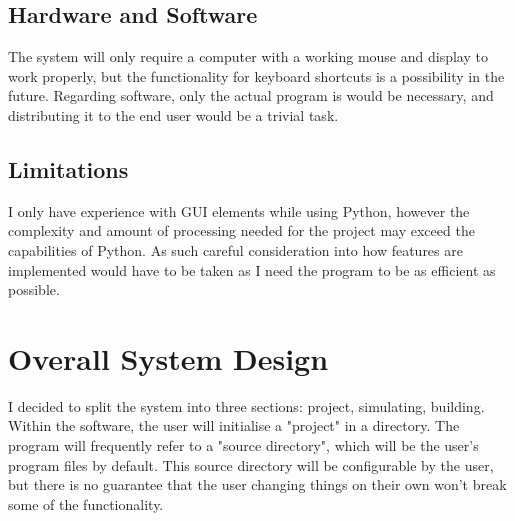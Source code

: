 \documentclass[11pt]{article}
\begin{document}
        \subsection{Hardware and Software}
            The system will only require a computer with a working mouse and display to work properly, but the functionality for keyboard shortcuts is a possibility in the future. Regarding software, only the actual program is would be necessary, and distributing it to the end user would be a trivial task.

        \subsection{Limitations}
            I only have experience with GUI elements while using Python, however the complexity and amount of processing needed for the project may exceed the capabilities of Python. As such careful consideration into how features are implemented would have to be taken as I need the program to be as efficient as possible. 



    \section{Overall System Design}
            I decided to split the system into three sections: project, simulating, building. Within the software, the user will initialise a "project" in a directory. The program will frequently refer to a "source directory", which will be the user's program files by default. This source directory will be configurable by the user, but there is no guarantee that the user changing things on their own won't break some of the functionality.
\end{document}

